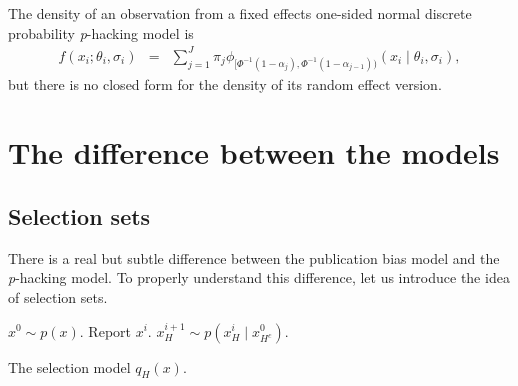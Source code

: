 \documentclass{article}
\theoremstyle{plain}
\theoremstyle{definition}
\begin{document}
The density of an observation from a fixed effects one-sided normal discrete probability \textit{p}-hacking model is
\begin{eqnarray}
f(x_{i};\theta_{i},\sigma_{i}) & = & \sum_{j=1}^{J}\pi_{j}\phi_{[\Phi^{-1}(1-\alpha_{j}),\Phi^{-1}(1-\alpha_{j-1}))}(x_{i}\mid\theta_{i},\sigma_{i}),\label{eq:Fixed effects, p-hacking}
\end{eqnarray}
but there is no closed form for the density of its random effect version.

\section{The difference between the models}\label{sect:differences}

\subsection{Selection sets\label{sec:Selection Sets}}
There is a real but subtle difference between the publication bias model and the \textit{p}-hacking model. To properly understand this difference, let us introduce the idea of selection sets.

\begin{algorithm}[!h]
\begin{algorithmic}[1]
	\State $x^{0}\sim p(x)$.
			\State Report $x^i$.           
		\Else         
			\State $x_{H}^{i+1}\sim p(x_{H}^{i}\mid x_{H^{c}}^{0})$.        
		\EndIf  
	\EndFor  
\end{algorithmic}
\caption{\label{alg:Selection model}The selection model $q_{H}(x)$.}
\end{algorithm}
\end{document}
